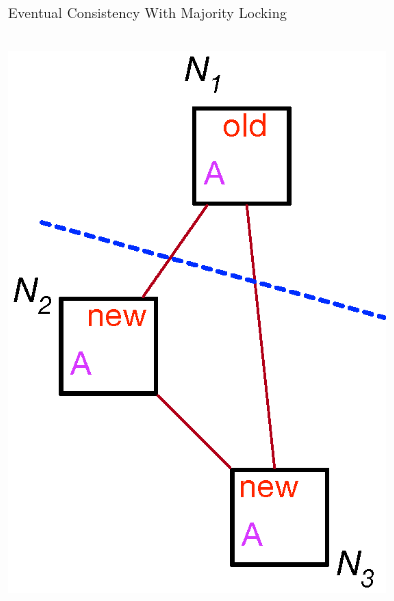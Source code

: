 \begin{frame}{Eventual Consistency With Majority Locking}
\begin{columns}[onlytextwidth]
\begin{column}{0.3\textwidth}
\includegraphics[width=0.75\textwidth]{figures/majority_inconsistent_A.eps}
\end{column}
\end{columns}
\end{frame}

%
%

